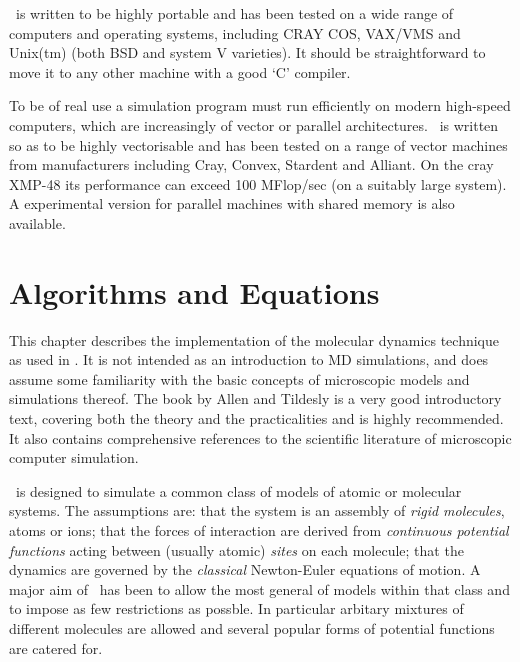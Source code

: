 \moldy\  is written to be highly portable and has been tested on a wide
range of computers and operating  systems, including CRAY COS, VAX/VMS
and  Unix(tm) (both   BSD  and  system  V  varieties).   It should  be
straightforward to  move  it to  any  other machine  with a   good `C'
compiler.

To be of real use a simulation  program must run efficiently on modern
high-speed computers, which  are  increasingly of vector   or parallel
architectures.  \moldy\  is written so  as to be highly vectorisable and
has been  tested on a   range of  vector machines  from  manufacturers
including Cray, Convex, Stardent and  Alliant.  On the cray XMP-48 its
performance can exceed 100 MFlop/sec (on a suitably large  system).  A
experimental version for parallel  machines with shared memory is also
available.

\chapter{Algorithms and Equations}

This chapter  describes the implementation  of the  molecular dynamics
technique as used in \moldy.  It is not intended as an introduction to
MD  simulations, and  does assume some    familiarity  with the  basic
concepts of microscopic models  and simulations thereof.  The book  by
Allen and Tildesly  \cite{allen:87}  is a  very good    introductory text,
covering   both the  theory  and  the  practicalities and  is   highly
recommended.  It   also  contains   comprehensive  references  to  the
scientific literature of microscopic computer simulation.

\moldy\  is designed to simulate a common class of models of atomic or
molecular systems. The assumptions are: that the system is an assembly
of  {\em rigid   molecules},  atoms   or  ions;  that  the  forces  of
interaction are derived   from {\em  continuous  potential  functions}
acting between (usually atomic) {\em sites} on each molecule; that the
dynamics are governed by the {\em classical} Newton-Euler equations of
motion.  A major aim of \moldy\ has been to allow the most  general of
models within that class and to impose as few restrictions as possble.
In particular arbitary mixtures of different molecules are allowed
and several popular forms of potential functions are catered for.

